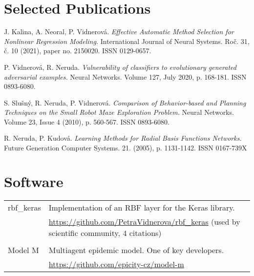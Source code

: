 \documentclass[a4paper, oneside, final]{scrartcl} %
\newcommand{\gray}{\rowcolor[gray]{.90}} %
\begin{document}
 \section{Selected Publications}
 \noindent
J. Kalina, A. Neoral, P. Vidnerová.
{\em Effective Automatic Method Selection for Nonlinear Regression Modeling.}
International Journal of Neural Systems. Roč. 31, č. 10 (2021), paper no. 2150020. ISSN 0129-0657.

\noindent
P. Vidnerov\'a, R. Neruda.  {\em Vulnerability of classifiers to evolutionary
  generated adversarial examples.}  Neural Networks. Volume 127, July 2020,
p. 168-181. ISSN 0893-6080.

\noindent
S. Slu\v{s}n\'y, R. Neruda, P. Vidnerov\'a.  {\em Comparison of
  Behavior-based and Planning Techniques on the Small Robot Maze
  Exploration Problem.}  Neural Networks. Volume 23, Issue 4 (2010),
p. 560-567. ISSN 0893-6080.

\noindent
R. Neruda, P. Kudov\'a.  {\em Learning Methods for Radial Basis
  Functions Networks.}  Future Generation Computer
Systems. 21. (2005), p. 1131-1142. ISSN 0167-739X

\section{Software}
\begin{tabularx}{0.97\linewidth}{>{\raggedleft}p{2cm}X}
\gray  rbf\_keras & Implementation of an RBF layer for the Keras library. \\
   & 
  \href{https://github.com/PetraVidnerova/rbf_keras}{https://github.com/PetraVidnerova/rbf\_keras}
  (used by scientific community, 4 citations)\\
  \\
  \gray Model M & Multiagent epidemic model. One of key developers. \\
  & \href{https://github.com/epicity-cz/model-m}{https://github.com/epicity-cz/model-m} \\
\end{tabularx}


\end{document}
